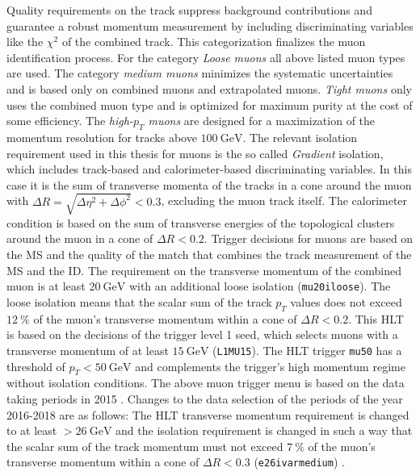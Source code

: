 Quality requirements on the track suppress background contributions and guarantee a robust momentum measurement by including discriminating variables like the $\chi^2$ of the combined track. This categorization finalizes the muon identification process. For the category \textit{Loose muons} all above listed muon types are used. The category \textit{medium muons} minimizes the systematic uncertainties and is based only on combined muons and extrapolated muons. \textit{Tight muons} only uses the combined muon type and is optimized for maximum purity at the cost of some efficiency. The \textit{high-$p_T$ muons} are designed for  a maximization of the momentum resolution for tracks above $\SI{100}{\giga\electronvolt}$. \cite{muPerformance}\newline
The relevant isolation requirement used in this thesis for muons is the so called \textit{Gradient} isolation, which includes track-based and calorimeter-based discriminating variables. In this case it is the sum of transverse momenta of the tracks in a cone around the muon with $\Delta R=\sqrt{\Delta\eta^2+\Delta\phi^2}<0.3$, excluding the muon track itself. The calorimeter condition is based on the sum of transverse energies of the topological clusters around the muon in a cone of $\Delta R<0.2$. \cite{muPerformance}\cite{varcone}\newline
Trigger decisions for muons are based on the MS and the quality of the match that combines the track measurement of the MS and the ID. The requirement on the transverse momentum of the combined muon is at least $\SI{20}{\giga\electronvolt}$ with an additional loose isolation (\texttt{mu20\textunderscore iloose}). The loose isolation means that the scalar sum of the track $p_T$ values does not exceed $\SI{12}{\percent}$ of the muon's transverse momentum within a cone of $\Delta R<0.2$. This HLT is based on the decisions of the trigger level 1 seed, which selects muons with a transverse momentum of at least $\SI{15}{\giga\electronvolt}$ (\texttt{L1MU15}). The HLT trigger \texttt{mu50} has a threshold of $p_T<\SI{50}{\giga\electronvolt}$ and complements the trigger's high momentum regime without isolation conditions. The above muon trigger menu is based on the data taking periods in 2015 \cite{trigger:e:mu}. Changes to the data selection of the periods of the year 2016-2018 are as follows: \newline
The HLT transverse momentum requirement is changed to at least $>\SI{26}{\giga\electronvolt}$ and the isolation requirement is changed in such a way that the scalar sum of the track momentum must not exceed $\SI{7}{\percent}$ of the muon's transverse momentum within a cone of $\Delta R<0.3$ (\texttt{e26\textunderscore ivarmedium}) \cite{trigger:mu}.            
%
%
